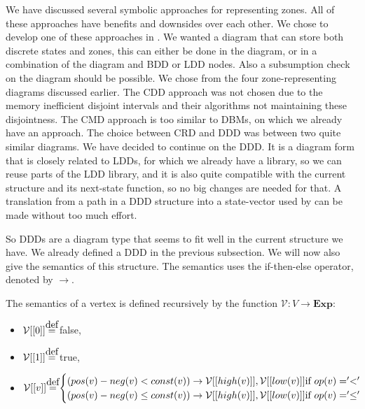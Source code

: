 We have discussed several symbolic approaches for representing zones. All of these approaches have benefits and downsides over each other. We chose to develop one of these approaches in \ltsmin{}. We wanted a diagram that can store both discrete states and zones, this can either be done in the diagram, or in a combination of the diagram and BDD or LDD nodes. Also a subsumption check on the diagram should be possible. We chose from the four zone-representing diagrams discussed earlier. The CDD approach was not chosen due to the memory inefficient disjoint intervals and their algorithms not maintaining these disjointness. The CMD approach is too similar to DBMs, on which we already have an approach. The choice between CRD and DDD was between two quite similar diagrams. We have decided to continue on the DDD. It is a diagram form that is closely related to LDDs, for which we already have a library, so we can reuse parts of the LDD library, and it is also quite compatible with the current \pins{} structure and its next-state function, so no big changes are needed for that. A translation from a path in a DDD structure into a state-vector used by \ltsmin{} can be made without too much effort. %

So DDDs are a diagram type that seems to fit well in the current structure we have. We already defined a DDD in the previous subsection. We will now also give the semantics of this structure. The semantics uses the if-then-else operator, denoted by $\rightarrow$.

\begin{mydef}
\label{def:Semantics1}
The semantics of a vertex is defined recursively by the function $\mathcal{V}: V \rightarrow \textbf{Exp}:$
\begin{itemize}
\item $\mathcal{V}[[0]] \myeq$ false,
\item $\mathcal{V}[[1]] \myeq$ true,
\item \begin{math} \mathcal{V}[[v]] \myeq
\begin{cases}
(pos(v) - neg(v) < const(v)) \rightarrow \mathcal{V}[[high(v)]],\mathcal{V}[[low(v)]]\text{if }op(v) = '<'\\
(pos(v) - neg(v) \leq const(v)) \rightarrow \mathcal{V}[[high(v)]],\mathcal{V}[[low(v)]]\text{if }op(v) = '\leq'
\end{cases}
\end{math}
\end{itemize}
\end{mydef}

